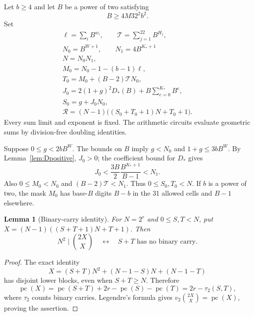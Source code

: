 \documentclass[11pt]{article}
\newtheorem{lemma}[theorem]{Lemma}
\newcommand{\pc}{\operatorname{pc}}
\begin{document}
Let $b\ge4$ and let $B$ be a power of two satisfying
\[
 B\ge4M32^2b^2.
\]
Set
\[\begin{gathered}
\ell=\sum_iB^{w_i},\qquad \mathcal T=\sum_{j=1}^{22}B^{H_j},\\
N_0=B^{W+1},\qquad N_1=4B^{K_*+1}\\
N=N_0N_1,\\
M_0=N_0-1-(b-1)\ell,\\
T_0=M_0+(B-2)\mathcal T N_0,\\
J_0=2(1+g)^2D_*(B)+B\sum_{e=0}^{K_*}B^e,\\
S_0=g+J_0N_0,\\
\mathcal R=(N-1)\bigl((S_0+T_0+1)N+T_0+1\bigr).
\end{gathered}\]
Every sum limit and exponent is fixed. The arithmetic circuits evaluate
geometric sums by division-free doubling identities.

Suppose $0\le g<2bB^W$. The bounds on $B$ imply $g<N_0$ and
$1+g\le3bB^W$. By Lemma~\ref{lem:Dpositive}, $J_0>0$; the coefficient
bound for $D_*$ gives
\[
 J_0<\frac{3B}{2}\frac{B^{K_*+1}}{B-1}<N_1.
\]
Also $0\le M_0<N_0$ and $(B-2)\mathcal T<N_1$. Thus
$0\le S_0,T_0<N$. If $b$ is a power of two, the mask $M_0$ has base-$B$
digits $B-b$ in the 31 allowed cells and $B-1$ elsewhere.

\begin{lemma}[Binary-carry identity]\label{lem:carry}
For $N=2^r$ and $0\le S,T<N$, put
$X=(N-1)((S+T+1)N+T+1)$. Then
\[
 N^2\mid\binom{2X}{X}\quad\longleftrightarrow\quad
 \text{$S+T$ has no binary carry}.
\]
\end{lemma}
\begin{proof}
The exact identity
\[
 X=(S+T)N^2+(N-1-S)N+(N-1-T)
\]
has disjoint lower blocks, even when $S+T\ge N$. Therefore
\[
 \pc(X)=\pc(S+T)+2r-\pc(S)-\pc(T)=2r-\tau_2(S,T),
\]
where $\tau_2$ counts binary carries. Legendre's formula gives
$v_2\binom{2X}{X}=\pc(X)$, proving the assertion.
\end{proof}
\end{document}
